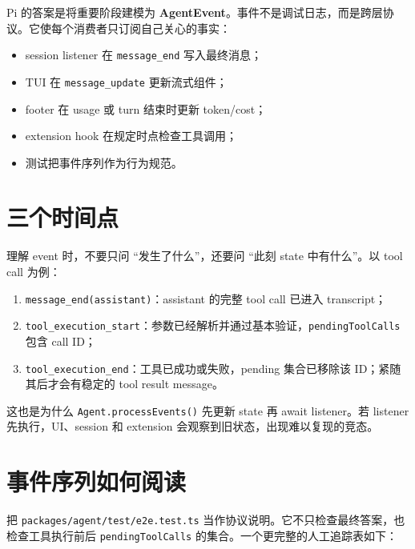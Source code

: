 \documentclass[UTF8,openany,11pt]{ctexbook}
\newcommand{\pathref}[1]{\texttt{#1}}
\newcommand{\term}[1]{\textbf{#1}}
\begin{document}
Pi 的答案是将重要阶段建模为 \term{AgentEvent}。事件不是调试日志，而是跨层协议。它使每个消费者只订阅自己关心的事实：
\begin{itemize}
\item session listener 在 \texttt{message\_end} 写入最终消息；
\item TUI 在 \texttt{message\_update} 更新流式组件；
\item footer 在 usage 或 turn 结束时更新 token/cost；
\item extension hook 在规定时点检查工具调用；
\item 测试把事件序列作为行为规范。
\end{itemize}

\section{三个时间点}
理解 event 时，不要只问 ``发生了什么''，还要问 ``此刻 state 中有什么''。以 tool call 为例：
\begin{enumerate}
\item \texttt{message\_end(assistant)}：assistant 的完整 tool call 已进入 transcript；
\item \texttt{tool\_execution\_start}：参数已经解析并通过基本验证，\texttt{pendingToolCalls} 包含 call ID；
\item \texttt{tool\_execution\_end}：工具已成功或失败，pending 集合已移除该 ID；紧随其后才会有稳定的 tool result message。
\end{enumerate}

这也是为什么 \texttt{Agent.processEvents()} 先更新 state 再 await listener。若 listener 先执行，UI、session 和 extension 会观察到旧状态，出现难以复现的竞态。

\section{事件序列如何阅读}
把 \pathref{packages/agent/test/e2e.test.ts} 当作协议说明。它不只检查最终答案，也检查工具执行前后 \texttt{pendingToolCalls} 的集合。一个更完整的人工追踪表如下：
\end{document}
